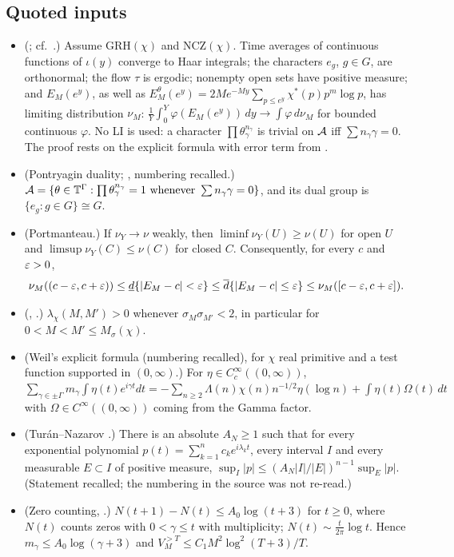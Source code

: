 \subsection{Quoted inputs}
\begin{itemize}
\item[(I1)] (\cite[Lemma~1.2, Theorem~1.3]{GO}; cf.\ \cite{RS,ANS,Devin,Bailleul}.) Assume GRH$(\chi)$ and NCZ$(\chi)$. Time averages of continuous functions of $\iota(y)$ converge to Haar integrals; the characters $e_g$, $g\in G$, are orthonormal; the flow $\tau$ is ergodic; nonempty open sets have positive measure; and $E_M(e^y)$, as well as $E^\theta_M(e^y)=2Me^{-My}\sum_{p\le e^y}\chi^*(p)p^m\log p$, has limiting distribution $\nu_M$: $\frac1Y\int_0^Y\varphi(E_M(e^y))\,dy\to\int\varphi\,d\nu_M$ for bounded continuous $\varphi$. No LI is used: a character $\prod\theta_\gamma^{n_\gamma}$ is trivial on $\mathcal A$ iff $\sum n_\gamma\gamma=0$. The proof rests on the explicit formula with error term from \cite{WR}.
\item[(I2)] (Pontryagin duality; \cite[2.1.2, 2.1.3]{Rudin}, numbering recalled.) $\mathcal A=\{\theta\in\mathbb T^\Gamma:\prod\theta_\gamma^{n_\gamma}=1\text{ whenever }\sum n_\gamma\gamma=0\}$, and its dual group is $\{e_g:g\in G\}\cong G$.
\item[(I3)] (Portmanteau.) If $\nu_Y\to\nu$ weakly, then $\liminf\nu_Y(U)\ge\nu(U)$ for open $U$ and $\limsup\nu_Y(C)\le\nu(C)$ for closed $C$. Consequently, for every $c$ and $\varepsilon>0$,
\begin{equation}\label{eq:portmanteau}
\nu_M((c-\varepsilon,c+\varepsilon))\le\underline d\{|E_M-c|<\varepsilon\}\le\overline d\{|E_M-c|\le\varepsilon\}\le\nu_M([c-\varepsilon,c+\varepsilon]).
\end{equation}
\item[(I4)] (\cite[Theorem~7.1]{GO}, \cite{MC}.) $\lambda_\chi(M,M')>0$ whenever $\sigma_M\sigma_{M'}<2$, in particular for $0<M<M'\le M_\sigma(\chi)$.
\item[(I5)] (Weil's explicit formula \cite[Theorem~5.12]{IK} (numbering recalled), for $\chi$ real primitive and a test function supported in $(0,\infty)$.) For $\eta\in C_c^\infty((0,\infty))$, $\sum_{\gamma\in\pm\Gamma}m_\gamma\int\eta(t)e^{i\gamma t}dt=-\sum_{n\ge2}\Lambda(n)\chi(n)n^{-1/2}\eta(\log n)+\int\eta(t)\Omega(t)\,dt$ with $\Omega\in C^\infty((0,\infty))$ coming from the Gamma factor.
\item[(I6)] (Tur\'an--Nazarov \cite{Nazarov}.) There is an absolute $A_N\ge1$ such that for every exponential polynomial $p(t)=\sum_{k=1}^nc_ke^{i\lambda_kt}$, every interval $I$ and every measurable $E\subset I$ of positive measure, $\sup_I|p|\le(A_N|I|/|E|)^{n-1}\sup_E|p|$. (Statement recalled; the numbering in the source was not re-read.)
\item[(I7)] (Zero counting, \cite[Ch.~16]{Davenport}.) $N(t+1)-N(t)\le A_0\log(t+3)$ for $t\ge0$, where $N(t)$ counts zeros with $0<\gamma\le t$ with multiplicity; $N(t)\sim\frac t{2\pi}\log t$. Hence $m_\gamma\le A_0\log(\gamma+3)$ and $V_M^{>T}\le C_1M^2\log^2(T+3)/T$.
\end{itemize}

